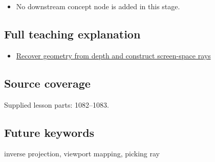 \begin{itemize}
\tightlist
\item
  No downstream concept node is added in this stage.
\end{itemize}

\subsection{Full teaching explanation}\label{appendix-f1a6d43e80d1-full-teaching-explanation}

\begin{itemize}
\tightlist
\item
  \hyperref[02-foundations-ii-ch035-recover-geometry-from-depth-and-construct-screen-space-rays]{Recover geometry from depth and construct screen-space rays}
\end{itemize}

\subsection{Source coverage}\label{appendix-f1a6d43e80d1-source-coverage}

Supplied lesson parts: 1082--1083.

\subsection{Future keywords}\label{appendix-f1a6d43e80d1-future-keywords}

inverse projection, viewport mapping, picking ray
